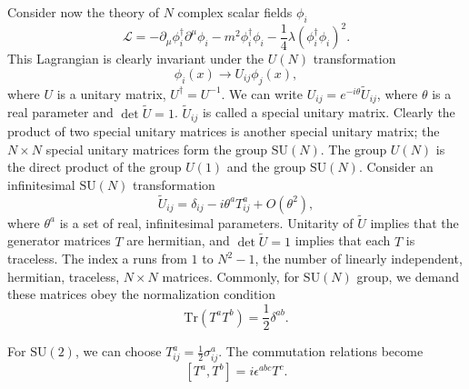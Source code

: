 \noindent
Consider now the theory of $N$ complex scalar fields $\phi_i$
\[\mathcal{L} = -\partial_{\mu}\phi^{\dagger}_i \partial^{\mu}\phi_i - m^2\phi_i^{\dagger}\phi_i - \frac{1}{4}\lambda(\phi_i^{\dagger}\phi_i)^2.\]
This Lagrangian is clearly invariant under the $U(N)$ transformation
\[\phi_i(x) \to U_{ij}\phi_j(x),\]
where $U$ is a unitary matrix, $U^{\dagger} = U^{-1}$. We can write $U_{ij} = e^{-i\theta} \widetilde{U}_{ij}$, where $\theta$ is a real parameter and $\det \widetilde{U} = 1$.
$\widetilde{U}_{ij}$ is called a special unitary matrix.
Clearly the product of two special unitary matrices is another special unitary matrix; the $N \times N$ special unitary matrices form the group $\mathrm{SU}(N)$. 
The group $U(N)$ is the direct product of the group $U(1)$ and the group $\mathrm{SU}(N)$.
Consider an infinitesimal $\mathrm{SU}(N)$ transformation
\[\widetilde{U}_{ij} = \delta_{ij} - i\theta^aT^a_{ij} + O(\theta^2),\]
where $\theta^a$ is a set of real, infinitesimal parameters. Unitarity of $\widetilde{U}$ implies that the generator matrices $T$ are hermitian, and $\det \widetilde{U} = 1$ implies that each $T$ is traceless.
The index a runs from $1$ to $N^2 - 1$, the number of linearly independent, hermitian, traceless, $N \times N$ matrices. Commonly, for $\mathrm{SU}(N)$ group, we demand these matrices obey the normalization condition
\[\mathrm{Tr}(T^a T^b) =\frac{1}{2}\delta^{ab}.\]

\begin{example}
For $\mathrm{SU}(2)$, we can choose $T^a_{ij} = \frac{1}{2}\sigma^a_{ij}$. The commutation relations become
\[[T^a,T^b] = i\epsilon^{abc}T^c.\]
\end{example}


